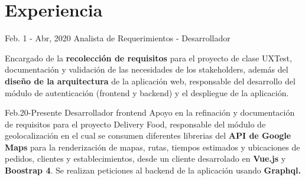\documentclass[american]{cv-class}
\begin{document}
\section{Experiencia}
\begin{entrylist}

	\entry
	{Feb. 1 - Abr, 2020}
	{Analista de Requerimientos - Desarrollador} 
	{ }
	{\justifying 
	    Encargado de la \textbf{recolección de requisitos} para el proyecto de clase UXTest, documentación y validación de las necesidades de los stakeholders, además del  \textbf{diseño de la arquitectura} de la aplicación web, responsable del desarrollo del módulo de autenticación (frontend y backend) y el despliegue de la aplicación.
	
	}
	\entry
	{Feb.20-Presente}
	{Desarrollador frontend}
	{ }
	{\justifying 
	Apoyo en la refinación y documentación de requisitos para el proyecto Delivery Food, responsable del módulo de geolocalización en el cual se consumen diferentes librerias del \textbf{API de Google Maps} para la renderización de mapas, rutas, tiempos estimados y ubicaciones de pedidos, clientes y establecimientos, desde un cliente desarrolado en \textbf{Vue.js} y \textbf{Boostrap 4}. Se realizan peticiones al backend de la aplicación usando \textbf{Graphql.}}
	
	
\end{entrylist}
\end{document}
